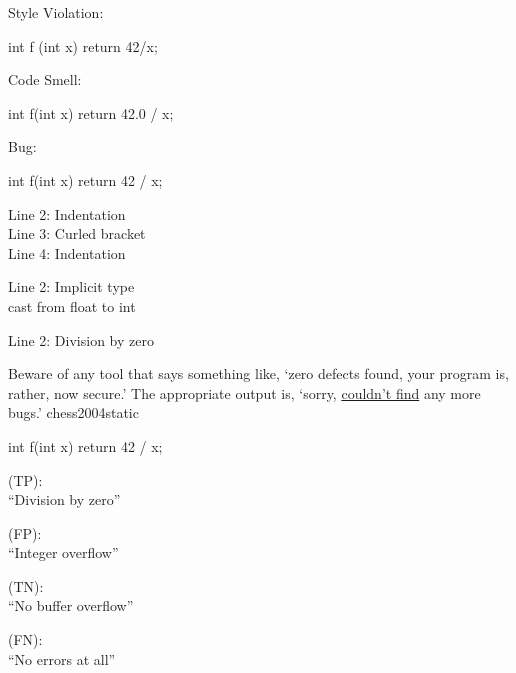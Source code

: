\documentclass{article}
\begin{document}
\begin{multicols}{3}
Style Violation:
{\small\begin{ffcode}
int f
  (int x)
{
     return 42/x;
}
\end{ffcode}
}
\par\columnbreak\par
Code Smell:\par
{\small\begin{ffcode}
int f(int x) {
  return 42.0 / x;
}
\end{ffcode}
}
\par\columnbreak\par
Bug:\par
{\small\begin{ffcode}
int f(int x) {
  return 42 / x;
}
\end{ffcode}
}
\end{multicols}
{\scriptsize\color{red}\ttfamily\begin{multicols}{3}
Line 2: Indentation \\
Line 3: Curled bracket \\
Line 4: Indentation
\par\columnbreak\par
Line 2: Implicit type \\
cast from float to int
\par\columnbreak\par
Line 2: Division by zero
\end{multicols}}
\plush{}

  {Beware of any tool that says something like, `zero defects found, your program is, rather, now secure.' The appropriate output is, `sorry, \ul{couldn’t find} any more bugs.'}
  {chess2004static}

\begin{multicols}{2}
{\small\begin{ffcode}
int f(int x) {
  return 42 / x;
}
\end{ffcode}
}
\par\columnbreak\par
\textcolor{green}{} (TP): \\ ``Division by zero''\par
\textcolor{red}{} (FP): \\ ``Integer overflow''\par
\textcolor{green}{} (TN): \\ ``No buffer overflow''\par
\textcolor{red}{} (FN): \\ ``No errors at all''\par
\end{multicols}
\plush{}
\end{document}
